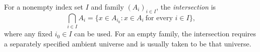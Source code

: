 
For a nonempty index set $I$ and family $(A_i)_{i\in I}$, the \emph{intersection} is
\[
\bigcap_{i\in I}A_i=\{x\in A_{i_0}:x\in A_i\ \text{for every }i\in I\},
\]
where any fixed $i_0\in I$ can be used. For an empty family, the intersection requires a separately specified ambient universe and is usually taken to be that universe.
